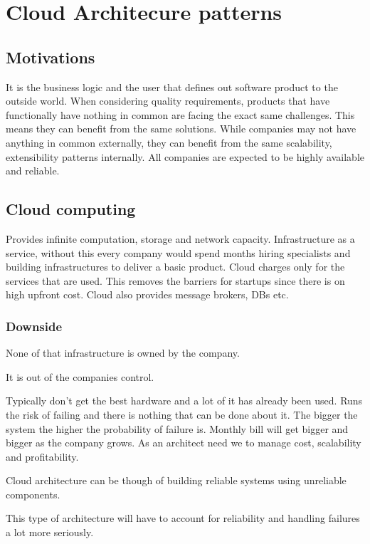 \chapter{Cloud Architecure patterns}


\section{Motivations}

It is the business logic and the user that defines out software product to the outside world.
When considering quality requirements, products that have functionally have nothing in common are facing the exact same challenges.
This means they can benefit from the same solutions.
While companies may not have anything in common externally, they can benefit from the same scalability, extensibility patterns internally.
All companies are expected to be highly available and reliable.


\section{Cloud computing}

Provides infinite computation, storage and network capacity.
Infrastructure as a service, without this every company would spend months hiring specialists and building infrastructures to deliver a basic product.
Cloud charges only for the services that are used.
This removes the barriers for startups since there is on high upfront cost.
Cloud also provides message brokers, DBs etc.

\subsection{Downside}

None of that infrastructure is owned by the company.

It is out of the companies control.

Typically don't get the best hardware and a lot of it has already been used.
Runs the risk of failing and there is nothing that can be done about it.
The bigger the system the higher the probability of failure is.
Monthly bill will get bigger and bigger as the company grows.
As an architect need we to manage cost, scalability and profitability.

Cloud architecture can be though of building reliable systems using unreliable components.

This type of architecture will have to account for reliability and handling failures a lot more seriously.


